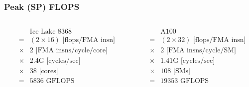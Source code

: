 \documentclass[12pt,dvipdfmx]{beamer}
\newcommand{\mura}[1]{{\color{purple}#1}}
\newcommand{\ao}[1]{{\color{blue}#1}}
\newcommand{\aka}[1]{{\color{red}#1}}
\begin{document}
\begin{frame}

\end{frame}

\begin{frame}
\frametitle{Peak (SP) FLOPS}
\begin{columns}
  \begin{column}{0.5\textwidth}
  \begin{eqnarray*}
    &        & \mbox{Ice Lake 8368} \\
    & =      & (2 \times 16) \mbox{ [flops/FMA insn]} \\
    & \times & 2 \mbox{ [FMA insns/cycle/core]} \\
    & \times & 2.4\mbox{G [cycles/sec]} \\
    & \times & 38 \mbox{ [cores]} \\
    & = &      5836 \mbox{ GFLOPS}
  \end{eqnarray*}
  \end{column}
  \begin{column}{0.5\textwidth}
  \begin{eqnarray*}
    &        & \mbox{A100} \\
    & =      & (2 \times 32) \mbox{ [flops/FMA insn]} \\
    & \times & 2 \mbox{ [FMA insns/cycle/SM]} \\
    & \times & 1.41\mbox{G [cycles/sec]} \\
    & \times & 108 \mbox{ [SMs]} \\
    & = &      19353 \mbox{ GFLOPS}
  \end{eqnarray*}
  \end{column}
\end{columns}
\end{frame}
\end{document}
